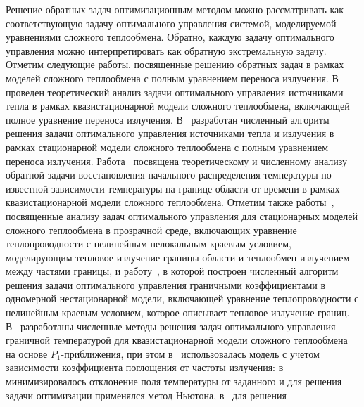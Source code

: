     Решение обратных задач оптимизационным методом можно
    рассматривать как соответствующую задачу оптимального управления
    системой, моделируемой уравнениями сложного теплообмена.
    Обратно, каждую задачу оптимального управления можно интерпретировать как
    обратную экстремальную задачу.
    Отметим следующие работы, посвященные
    решению обратных задач в рамках моделей сложного теплообмена с полным
    уравнением переноса излучения.
    В~\cite{end2011analytical} проведен теоретический анализ
    задачи оптимального управления источниками тепла в рамках
    квазистационарной модели сложного теплообмена, включающей полное
    уравнение переноса излучения.
    В~\cite{end2010optimization} разработан численный алгоритм
    решения задачи оптимального управления источниками тепла и излучения в
    рамках стационарной модели сложного теплообмена с полным уравнением
    переноса излучения.
    Работа~\cite{Pereverzyev2008} посвящена теоретическому и численному
    анализу обратной задачи восстановления начального распределения
    температуры по известной зависимости температуры на границе области от
    времени в рамках квазистационарной модели сложного теплообмена.
    Отметим также работы~\cite{birgelis2003optimal, meyer2006optimal, meyer2009state, Philip2010},
    посвященные анализу задач оптимального управления для стационарных
    моделей сложного теплообмена в прозрачной среде, включающих уравнение теплопроводности с
    нелинейным нелокальным краевым условием, моделирующим тепловое
    излучение границы области и теплообмен излучением между частями
    границы, и работу~\cite{belmiloudi2014nonlinear},
    в которой построен численный алгоритм решения
    задачи оптимального управления граничными коэффициентами
    в одномерной нестационарной модели, включающей уравнение
    теплопроводности с нелинейным краевым условием, которое описывает
    тепловое излучение границ.
    В~\cite{clever2012optimal, clever2014model, frank2010optimal, lang2005adaptive, Pinnau2007b, Pinnau2004}
    разработаны численные
    методы решения задач оптимального управления граничной температурой
    для квазистационарной модели сложного теплообмена на основе $P_1$-приближения,
    при этом в~\cite{clever2012optimal, clever2014model, lang2005adaptive} использовалась
    модель с учетом зависимости коэффициента поглощения от частоты излучения:
    в~\cite{frank2010optimal, Pinnau2007b}
    минимизировалось отклонение поля температуры от заданного и для
    решения задачи оптимизации применялся метод Ньютона, в~\cite{lang2005adaptive} для решения
